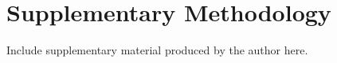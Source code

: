 \chapter{Supplementary Methodology}\label{app:methods}
Include supplementary material produced by the author here.
